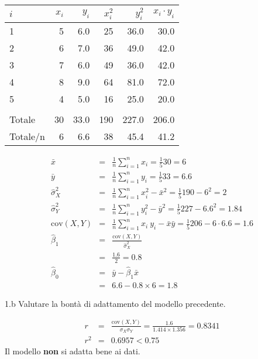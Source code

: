 \documentclass[
  11pt,
]{book}
\theoremstyle{mytheoremstyle}
\theoremstyle{mydefstyle}
\newenvironment{sol}
  {
  \begin{tcolorbox}[enhanced,breakable,arc=0.1mm,boxrule=1pt,colback=white,colframe=iblue,
  title=\bf \fontfamily{lmss}\selectfont \hspace{.5 cm} Soluzione,drop fuzzy shadow]

}{
\end{tcolorbox}
  }
\begin{document}
\begin{sol}

\begin{table}[H]
\centering
\begin{tabular}{lrrrrr}
\toprule
$i$ & $x_i$ & $y_i$ & $x_i^2$ & $y_i^2$ & $x_i\cdot y_i$\\
\midrule
1 & 5 & 6.0 & 25 & 36.0 & 30.0\\
2 & 6 & 7.0 & 36 & 49.0 & 42.0\\
3 & 7 & 6.0 & 49 & 36.0 & 42.0\\
4 & 8 & 9.0 & 64 & 81.0 & 72.0\\
5 & 4 & 5.0 & 16 & 25.0 & 20.0\\
\midrule\\
Totale & 30 & 33.0 & 190 & 227.0 & 206.0\\
Totale/n & 6 & 6.6 & 38 & 45.4 & 41.2\\
\bottomrule
\end{tabular}
\end{table}

\begin{eqnarray*}
           \bar x &=&\frac 1 n\sum_{i=1}^n x_i = \frac {1}{ 5 }  30 =  6 \\
           \bar y &=&\frac 1 n\sum_{i=1}^n y_i = \frac {1}{ 5 }  33 =  6.6 \\
           \hat\sigma_X^2&=&\frac 1 n\sum_{i=1}^n x_i^2-\bar x^2=\frac {1}{ 5 }  190  - 6 ^2= 2 \\
           \hat\sigma_Y^2&=&\frac 1 n\sum_{i=1}^n y_i^2-\bar y^2=\frac {1}{ 5 }  227  - 6.6 ^2= 1.84 \\
           \text{cov}(X,Y)&=&\frac 1 n\sum_{i=1}^n x_i~y_i-\bar x\bar y=\frac {1}{ 5 }  206 - 6 \cdot 6.6 = 1.6 \\
           \hat\beta_1 &=& \frac{\text{cov}(X,Y)}{\hat\sigma_X^2} \\
                    &=& \frac{ 1.6 }{ 2 }  =  0.8 \\
           \hat\beta_0 &=& \bar y - \hat\beta_1 \bar x\\
                    &=&  6.6 - 0.8 \times  6 = 1.8 
         \end{eqnarray*}

\end{sol}

1.b Valutare la bontà di adattamento del modello precedente.

\begin{sol}
\begin{eqnarray*}
r&=&\frac{\text{cov}(X,Y)}{\sigma_X\sigma_Y}=\frac{ 1.6 }{ 1.414 \times 1.356 }= 0.8341 \\r^2&=& 0.6957 < 0.75
\end{eqnarray*}
Il modello \textbf{non} si adatta bene ai dati.

\end{sol}
\end{document}
